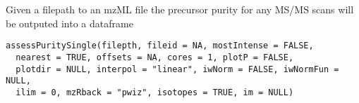 \documentclass[letterpaper]{book}
\begin{document}
%
\begin{Description}\relax
Given a filepath to an mzML file the precursor purity for any MS/MS scans
will be outputed into a dataframe
\end{Description}
%
\begin{Usage}
\begin{verbatim}
assessPuritySingle(filepth, fileid = NA, mostIntense = FALSE,
  nearest = TRUE, offsets = NA, cores = 1, plotP = FALSE,
  plotdir = NULL, interpol = "linear", iwNorm = FALSE, iwNormFun = NULL,
  ilim = 0, mzRback = "pwiz", isotopes = TRUE, im = NULL)
\end{verbatim}
\end{Usage}
%
\end{document}
